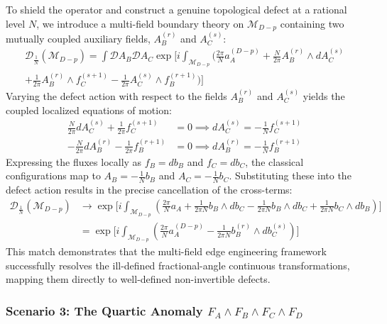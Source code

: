 \documentclass[aps,preprint,nofootinbib,preprintnumbers,eqsecnum,superscriptaddress]{revtex4}
\numberwithin{equation}{section}
\begin{document}
To shield the operator and construct a genuine topological defect at a rational level $N$, we introduce a multi-field boundary theory on $\mathcal{M}_{D-p}$ containing two mutually coupled auxiliary fields, $A^{(r)}_B$ and $A^{(s)}_C$:
\begin{multline}
    \mathcal{D}_{\frac{1}{N}}(\mathcal{M}_{D-p}) = \int \mathcal{D}A_B \mathcal{D}A_C \exp \Bigg[ i \int_{\mathcal{M}_{D-p}} \bigg( \frac{2\pi}{N} a^{(D-p)}_A + \frac{N}{2\pi} A^{(r)}_B \wedge dA^{(s)}_C \\
    + \frac{1}{2\pi} A^{(r)}_B \wedge f^{(s+1)}_C - \frac{1}{2\pi} A^{(s)}_C \wedge f^{(r+1)}_B \bigg) \Bigg]
\end{multline}
Varying the defect action with respect to the fields $A^{(r)}_B$ and $A^{(s)}_C$ yields the coupled localized equations of motion:
\begin{align}
    \frac{N}{2\pi} dA^{(s)}_C + \frac{1}{2\pi} f^{(s+1)}_C &= 0 \implies dA^{(s)}_C = -\frac{1}{N} f^{(s+1)}_C \\
    -\frac{N}{2\pi} dA^{(r)}_B - \frac{1}{2\pi} f^{(r+1)}_B &= 0 \implies dA^{(r)}_B = -\frac{1}{N} f^{(r+1)}_B
\end{align}
Expressing the fluxes locally as $f_B = db_B$ and $f_C = db_C$, the classical configurations map to $A_B = -\frac{1}{N}b_B$ and $A_C = -\frac{1}{N}b_C$. Substituting these into the defect action results in the precise cancellation of the cross-terms:
\begin{align}
    \mathcal{D}_{\frac{1}{N}}(\mathcal{M}_{D-p}) &\longrightarrow \exp \Bigg[ i \int_{\mathcal{M}_{D-p}} \left( \frac{2\pi}{N} a_A + \frac{1}{2\pi N} b_B \wedge db_C - \frac{1}{2\pi N} b_B \wedge db_C + \frac{1}{2\pi N} b_C \wedge db_B \right) \Bigg] \nonumber \\
    &= \exp \Bigg[ i \int_{\mathcal{M}_{D-p}} \left( \frac{2\pi}{N} a^{(D-p)}_A - \frac{1}{2\pi N} b^{(r)}_B \wedge db^{(s)}_C \right) \Bigg]
\end{align}
This match demonstrates that the multi-field edge engineering framework successfully resolves the ill-defined fractional-angle continuous transformations, mapping them directly to well-defined non-invertible defects.

\subsubsection{Scenario 3: The Quartic Anomaly $F_A \wedge F_B \wedge F_C \wedge F_D$}
\label{sec:scenario3}
\end{document}
